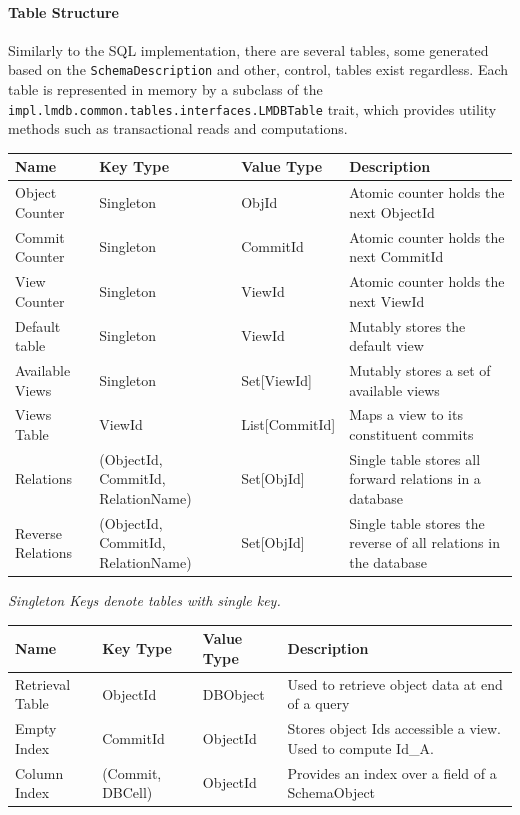 \documentclass[12pt,a4paper,twoside,openright]{report}
\newcommand\codeName[1]{\texttt{#1}}
\newcommand\note[1]{\textit{#1}}
\begin{document}
		\paragraph{Table Structure}
	
 Similarly to the SQL implementation, there are several tables, some generated based on the \codeName{SchemaDescription} and other, control, tables exist regardless. Each table is represented in memory by a subclass of the \codeName{impl.lmdb.common.tables.interfaces.LMDBTable} trait, which provides utility methods such as transactional reads and computations.
 
\begin{center}
	\begin{tabular}{ |p{3cm}||p{3cm}|p{3cm}||p{3cm}|}
 	\hline
 		
	Name & Key Type & Value Type  & Description \\ \hline
	Object Counter & Singleton & ObjId & Atomic counter holds the next ObjectId \\ \hline
	Commit Counter & Singleton & CommitId & Atomic counter holds the next CommitId \\ \hline
	View Counter & Singleton & ViewId & Atomic counter holds the next ViewId \\ \hline
	Default table & Singleton & ViewId & Mutably stores the default view \\ \hline
	Available Views & Singleton & Set[ViewId] & Mutably stores a set of available views \\ \hline
	Views Table & ViewId & List[CommitId] & Maps a view to its constituent commits \\ \hline
	Relations & (ObjectId, CommitId, RelationName) & Set[ObjId] & Single table stores all forward relations in a database \\ \hline
	Reverse Relations & (ObjectId, CommitId, RelationName) & Set[ObjId] & Single table stores the reverse of all relations in the database \\ \hline
	\end{tabular}
\end{center} 
 
 \note{Singleton Keys denote tables with single key.}
 \begin{center}
	\begin{tabular}{ |p{3cm}||p{3cm}|p{3cm}||p{3cm}|}
 	\hline
	Name & Key Type & Value Type  & Description \\ \hline
	Retrieval Table & ObjectId & DBObject & Used to retrieve object data at end of a query \\ \hline
	Empty Index & CommitId & ObjectId & Stores object Ids accessible a view. Used to compute Id_A. \\ \hline
	Column Index &  (Commit, DBCell) & ObjectId & Provides an index over a field of a SchemaObject \\ \hline
	\end{tabular}
\end{center}
\end{document}
